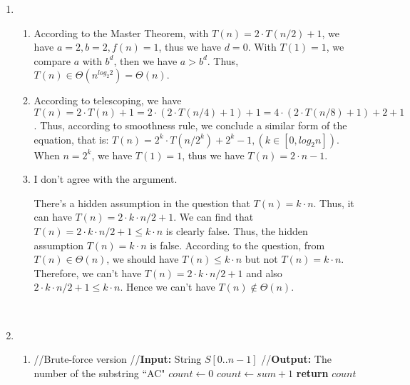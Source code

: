 \documentclass[11pt]{article}
\begin{document}
\begin{enumerate}
\item

\begin{enumerate}
\item
According to the Master Theorem, with $T(n)=2\cdot T(n/2)+1$,
we have $a=2, b=2, f(n)=1$, thus we have $d=0$. With $T(1)=1$, 
we compare $a$ with $b^d$, then we have $a>b^d$. Thus, $T(n) \in \Theta(n^{log_2 2})=\Theta(n)$.

\item
According to telescoping, 
we have $T(n)=2\cdot T(n)+1=2\cdot (2\cdot T(n/4)+1)+1=4\cdot (2\cdot T(n/8)+1)+2+1$. 
Thus, according to smoothness rule, we conclude a similar form of the equation, 
that is: $T(n)=2^k\cdot T(n/2^k)+2^k-1, (k \in [0, {log_2 n}])$. When $n=2^k$, 
we have $T(1)=1$, thus we have $T(n)=2\cdot n-1$.
\item
I don't agree with the argument.

There's a hidden assumption in the question that $T(n)=k\cdot n$. 
Thus, it can have $T(n)=2\cdot k \cdot n/2+1$. 
We can find that $T(n)=2\cdot k \cdot n/2+1 \leq k \cdot n$ is clearly false. 
Thus, the hidden assumption $T(n)=k\cdot n$ is false. According to the question, 
from $T(n)\in \Theta(n)$, we should have $T(n)\leq k\cdot n$ but not $T(n)=k\cdot n$. 
Therefore, we can't have $T(n)=2\cdot k \cdot n/2+1$ and also $2\cdot k \cdot n/2+1 \leq k\cdot n$. 
Hence we can't have $T(n)\notin \Theta(n)$.
~
\end{enumerate}
~
\item
\begin{enumerate}
\item
\begin{algorithmic}[1]
	\State //Brute-force version
	\State //\textbf{Input:} String $S[0..n-1]$
	\State //\textbf{Output:} The number of the substring \textquotedblleft AC"
	\State $count\gets 0$
					\State $count\gets sum+1$
				\EndIf
			\EndFor
		\EndIf
	\EndFor
	\State \textbf{return} $count$
\EndFunction
\end{algorithmic}
~



\end{enumerate}
\end{enumerate}
\end{document}
